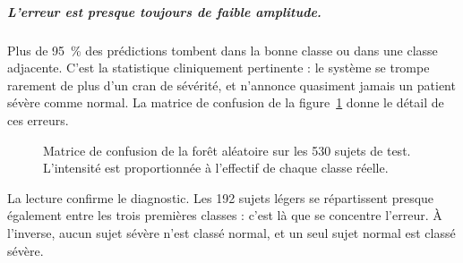 \subparagraph{L'erreur est presque toujours de faible amplitude.} Plus de \SI{95}{\percent}
des prédictions tombent dans la bonne classe ou dans une classe adjacente. C'est la
statistique cliniquement pertinente : le système se trompe rarement de plus d'un cran de
sévérité, et n'annonce quasiment jamais un patient sévère comme normal. La matrice de
confusion de la figure~\ref{fig:cm-osa} donne le détail de ces erreurs.

\begin{figure}[H]
\centering
{}
\vspace{0.3cm}
\caption[Matrice de confusion de la prédiction de sévérité]%
        {Matrice de confusion de la forêt aléatoire sur les 530 sujets de test.
         L'intensité est proportionnée à l'effectif de chaque classe réelle.}
\label{fig:cm-osa}
\end{figure}

La lecture confirme le diagnostic. Les \num{192} sujets légers se répartissent presque
également entre les trois premières classes : c'est là que se concentre l'erreur. À
l'inverse, aucun sujet sévère n'est classé normal, et un seul sujet normal est classé
sévère.

